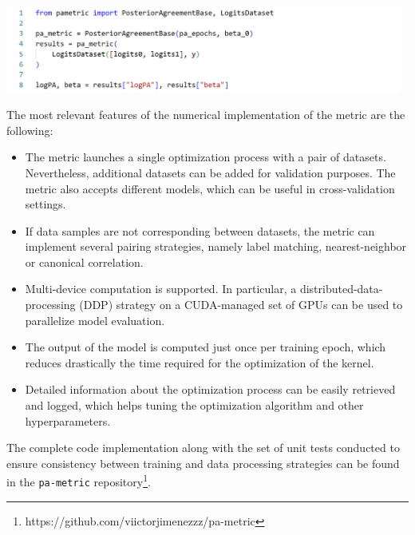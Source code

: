 \fboxrule=1pt           %
\fboxsep=1pt            %
\colorbox{gray!30}{     %
    \includegraphics[width=0.98\textwidth]{img/theoretical_background/pametric_code.png}  %
}

\begin{properties}
    The most relevant features of the numerical implementation of the metric are the following:
\begin{itemize}
    \item The metric launches a single optimization process with a pair of datasets. Nevertheless, 
    additional datasets can be added for validation purposes. The metric also accepts different models,
    which can be useful in cross-validation settings.
    \item If data samples are not corresponding between datasets, the metric can implement several
    pairing strategies, namely label matching, nearest-neighbor or canonical correlation.
    \item Multi-device computation is supported. In particular, a distributed-data-processing (DDP)
    strategy on a CUDA-managed set of GPUs can be used to parallelize model evaluation.
    \item The output of the model is computed just once per training epoch, which reduces drastically
    the time required for the optimization of the kernel.
    \item Detailed information about the optimization process can be easily retrieved and logged, which helps
    tuning the optimization algorithm and other hyperparameters.
\end{itemize}
\end{properties}

The complete code implementation along with the set of unit tests conducted 
to ensure consistency between training and data processing strategies can be 
found in the \texttt{pa-metric} repository\footnote{https://github.com/viictorjimenezzz/pa-metric}.

